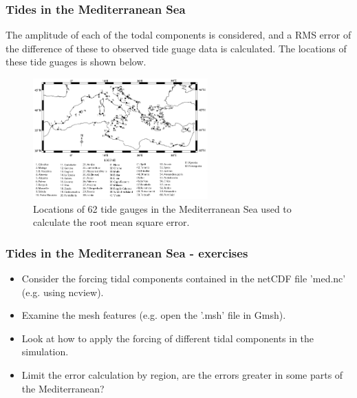 \begin{frame}
    \frametitle{Tides in the Mediterranean Sea}
The amplitude of each of the todal components is considered, and a RMS error of the difference of these to observed tide guage data is calculated.  The locations of these tide guages is shown below.
\begin{figure}
\centering
\includegraphics[width=0.6\textwidth]{./tides_in_the_Mediterranean_Sea/gauges.png}
\caption{Locations of 62 tide gauges in the Mediterranean Sea used to calculate the root mean square error.}
\end{figure}
\end{frame}


\begin{frame}
    \frametitle{Tides in the Mediterranean Sea - exercises}
\centering
\begin{itemize}
\item Consider the forcing tidal components contained in the netCDF file 'med.nc' (e.g. using ncview).
\item Examine the mesh features (e.g. open the '.msh' file in Gmsh).
\item Look at how to apply the forcing of different tidal components in the simulation.
\item Limit the error calculation by region, are the errors greater in some parts of the Mediterranean?
\end{itemize}
\end{frame}
